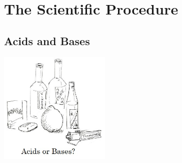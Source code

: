 \section{The Scientific Procedure} 



\subsection{Acids and Bases}

\begin{center}
\includegraphics[width=0.4\textwidth]{./img/source/acids-bases-sci-meth.jpg}
\end{center}

